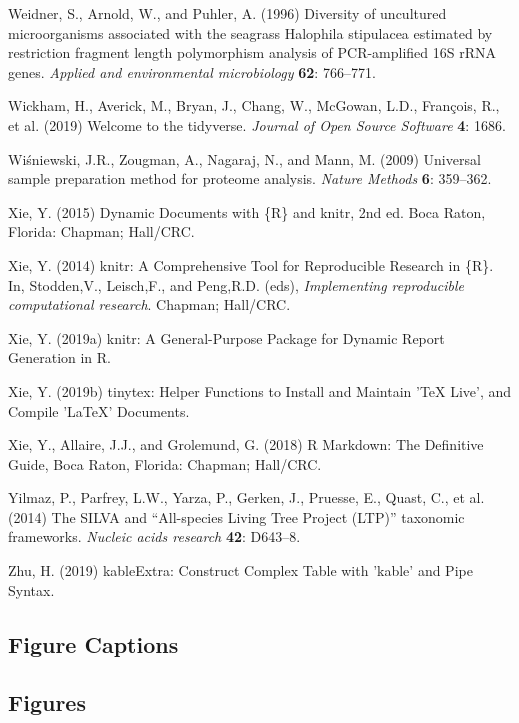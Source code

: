 \documentclass[12pt,]{article}
\begin{document}
\hypertarget{ref-Weidner1996}{}
Weidner, S., Arnold, W., and Puhler, A. (1996) Diversity of uncultured
microorganisms associated with the seagrass Halophila stipulacea
estimated by restriction fragment length polymorphism analysis of
PCR-amplified 16S rRNA genes. \emph{Applied and environmental
microbiology} \textbf{62}: 766--771.

\hypertarget{ref-Wickham2019}{}
Wickham, H., Averick, M., Bryan, J., Chang, W., McGowan, L.D., François,
R., et al. (2019) Welcome to the tidyverse. \emph{Journal of Open Source
Software} \textbf{4}: 1686.

\hypertarget{ref-Wisniewski2009}{}
Wiśniewski, J.R., Zougman, A., Nagaraj, N., and Mann, M. (2009)
Universal sample preparation method for proteome analysis. \emph{Nature
Methods} \textbf{6}: 359--362.

\hypertarget{ref-Xie2015}{}
Xie, Y. (2015) Dynamic Documents with \{R\} and knitr, 2nd ed. Boca
Raton, Florida: Chapman; Hall/CRC.

\hypertarget{ref-Xie2014}{}
Xie, Y. (2014) knitr: A Comprehensive Tool for Reproducible Research in
\{R\}. In, Stodden,V., Leisch,F., and Peng,R.D. (eds),
\emph{Implementing reproducible computational research}. Chapman;
Hall/CRC.

\hypertarget{ref-Xie2019a}{}
Xie, Y. (2019a) knitr: A General-Purpose Package for Dynamic Report
Generation in R.

\hypertarget{ref-Xie2019}{}
Xie, Y. (2019b) tinytex: Helper Functions to Install and Maintain 'TeX
Live', and Compile 'LaTeX' Documents.

\hypertarget{ref-Xie2018}{}
Xie, Y., Allaire, J.J., and Grolemund, G. (2018) R Markdown: The
Definitive Guide, Boca Raton, Florida: Chapman; Hall/CRC.

\hypertarget{ref-Yilmaz2014}{}
Yilmaz, P., Parfrey, L.W., Yarza, P., Gerken, J., Pruesse, E., Quast,
C., et al. (2014) The SILVA and ``All-species Living Tree Project
(LTP)'' taxonomic frameworks. \emph{Nucleic acids research} \textbf{42}:
D643--8.

\hypertarget{ref-Zhu2019}{}
Zhu, H. (2019) kableExtra: Construct Complex Table with 'kable' and Pipe
Syntax.

\newpage 

\subsection{Figure Captions}\label{figure-captions}

\subsection{Figures}\label{figures}
\end{document}
